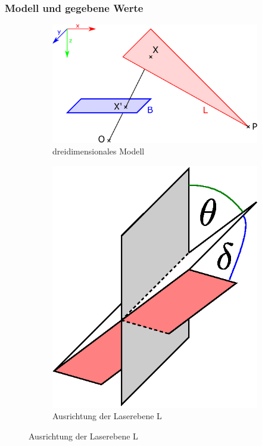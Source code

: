 \documentclass[ngerman,a4paper,parskip=half]{scrartcl}
\begin{document}
\subsubsection{Modell und gegebene Werte}

\begin{figure}
	\centering
	\begin{subfigure}{0.55\textwidth}
		\includegraphics[width=\textwidth]{includes/triangulation3d}
		\caption{dreidimensionales Modell}
		\label{fig:triangulation3d}
	\end{subfigure}
	\hfill
	\begin{subfigure}{0.35\textwidth}
		\includegraphics[width=\textwidth]{includes/triangulation_skew_pitch}
		\caption{Ausrichtung der Laserebene L}
		\label{fig:triangulation_skew_pitch}
	\end{subfigure}


\end{figure}
\end{document}
